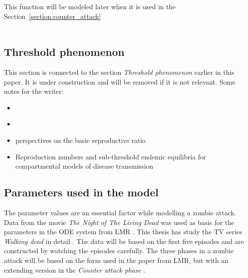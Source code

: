 \documentclass[%
twoside,                 %
final,                   %
10pt]{article}
\begin{document}
\noindent
This function will be modeled later when it is used in the Section~\ref{section:counter_attack}
\\
\\
\subsection{Threshold phenomenon}
This section is connected to the section \emph{Threshold phenomenon} earlier in this paper. It is under construction and will be removed if it is not relevant. Some notes for the writer:
\begin{itemize}
\item \cite[p.~22]{zombie-math}

\item \cite[p.~136-142]{munz2009zombies}

\item perspectives on the basic reproductive ratio

\item Reproduction numbers and sub-threshold endemic equilibria for compartmental models of disease transmission
\end{itemize}

\noindent
\subsection{Parameters used in the model}
The parameter values are an essential factor while modelling a zombie attack. Data from the movie \emph{The Night of The Living Dead} was used as basis for the parameters in the ODE system from LMR \cite{zombie-math}. This thesis has study the TV series \emph{Walking dead} in detail \cite{walking_dead}. The data will be based on the first five episodes and are constructed by watching the episodes carefully. The three phases in a zombie attack will be based on the form used in the paper from LMR, but with an extending version in the \emph{Counter attack phase} .
\end{document}
